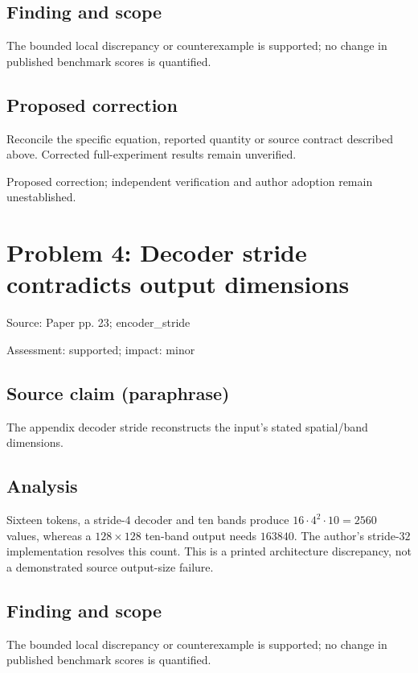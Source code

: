 \documentclass[11pt]{article}
\begin{document}
\subsection*{Finding and scope}

The bounded local discrepancy or counterexample is supported; no change in published benchmark scores is quantified.

\subsection*{Proposed correction}

Reconcile the specific equation, reported quantity or source contract described above. Corrected full-experiment results remain unverified.

Proposed correction; independent verification and author adoption remain unestablished.

\section*{Problem 4: Decoder stride contradicts output dimensions}

Source: Paper pp. 23; encoder\_stride

Assessment: supported; impact: minor

\subsection*{Source claim (paraphrase)}

The appendix decoder stride reconstructs the input’s stated spatial/band dimensions.

\subsection*{Analysis}

Sixteen tokens, a stride-\(4\) decoder and ten bands produce \(16\cdot4^2\cdot10=2560\) values, whereas a \(128\times128\) ten-band output needs \(163840\). The author's stride-\(32\) implementation resolves this count. This is a printed architecture discrepancy, not a demonstrated source output-size failure.

\subsection*{Finding and scope}

The bounded local discrepancy or counterexample is supported; no change in published benchmark scores is quantified.
\end{document}
